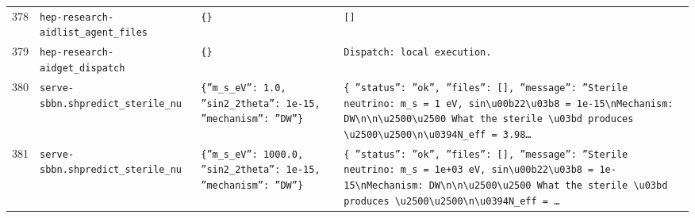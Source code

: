 \documentclass[11pt,a4paper]{article}
\begin{document}
\begin{longtable}{@{}p{}p{}p{}p{}@{}}
378 & \texttt{hep-research-aid}\newline\texttt{list\_\allowbreak{}agent\_\allowbreak{}files} & \texttt{\{\}\allowbreak{}} & \texttt{[]\allowbreak{}} \\
379 & \texttt{hep-research-aid}\newline\texttt{get\_\allowbreak{}dispatch} & \texttt{\{\}\allowbreak{}} & \texttt{Dispatch:\allowbreak{} local execution.} \\
380 & \texttt{serve-sbbn.sh}\newline\texttt{predict\_\allowbreak{}sterile\_\allowbreak{}nu} & \texttt{\{''m\_\allowbreak{}s\_\allowbreak{}eV'':\allowbreak{} 1.0,\allowbreak{} ''sin2\_\allowbreak{}2theta'':\allowbreak{} 1e-15,\allowbreak{} ''mechanism'':\allowbreak{} ''DW''\}\allowbreak{}} & \texttt{\{   ''status'':\allowbreak{} ''ok'',\allowbreak{}   ''files'':\allowbreak{} []\allowbreak{},\allowbreak{}   ''message'':\allowbreak{} ''Sterile neutrino:\allowbreak{} m\_\allowbreak{}s =\allowbreak{} 1 eV,\allowbreak{} sin\textbackslash{}\allowbreak{}u00b22\textbackslash{}\allowbreak{}u03b8 =\allowbreak{} 1e-15\textbackslash{}\allowbreak{}nMechanism:\allowbreak{} DW\textbackslash{}\allowbreak{}n\textbackslash{}\allowbreak{}n\textbackslash{}\allowbreak{}u2500\textbackslash{}\allowbreak{}u2500 What the sterile \textbackslash{}\allowbreak{}u03bd produces \textbackslash{}\allowbreak{}u2500\textbackslash{}\allowbreak{}u2500\textbackslash{}\allowbreak{}n\textbackslash{}\allowbreak{}u0394N\_\allowbreak{}eff =\allowbreak{} 3.98\ldots{}\allowbreak{}} \\
381 & \texttt{serve-sbbn.sh}\newline\texttt{predict\_\allowbreak{}sterile\_\allowbreak{}nu} & \texttt{\{''m\_\allowbreak{}s\_\allowbreak{}eV'':\allowbreak{} 1000.0,\allowbreak{} ''sin2\_\allowbreak{}2theta'':\allowbreak{} 1e-15,\allowbreak{} ''mechanism'':\allowbreak{} ''DW''\}\allowbreak{}} & \texttt{\{   ''status'':\allowbreak{} ''ok'',\allowbreak{}   ''files'':\allowbreak{} []\allowbreak{},\allowbreak{}   ''message'':\allowbreak{} ''Sterile neutrino:\allowbreak{} m\_\allowbreak{}s =\allowbreak{} 1e+03 eV,\allowbreak{} sin\textbackslash{}\allowbreak{}u00b22\textbackslash{}\allowbreak{}u03b8 =\allowbreak{} 1e-15\textbackslash{}\allowbreak{}nMechanism:\allowbreak{} DW\textbackslash{}\allowbreak{}n\textbackslash{}\allowbreak{}n\textbackslash{}\allowbreak{}u2500\textbackslash{}\allowbreak{}u2500 What the sterile \textbackslash{}\allowbreak{}u03bd produces \textbackslash{}\allowbreak{}u2500\textbackslash{}\allowbreak{}u2500\textbackslash{}\allowbreak{}n\textbackslash{}\allowbreak{}u0394N\_\allowbreak{}eff =\allowbreak{} \ldots{}\allowbreak{}} \\

\end{longtable}
\end{document}
